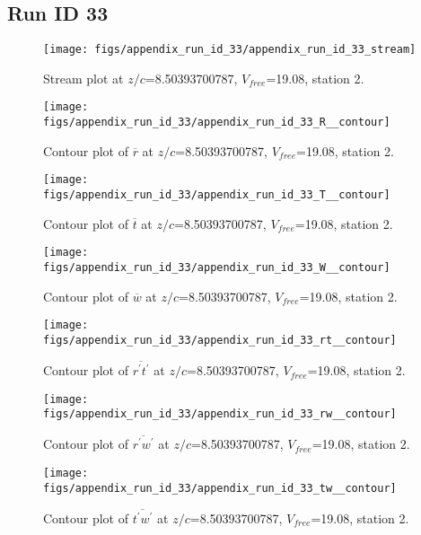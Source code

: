\subsection{Run ID 33}
\begin{figure}[H]
\centering
\texttt{[image: figs/appendix\_run\_id\_33/appendix\_run\_id\_33\_stream]}
\caption{Stream plot at $z/c$=8.50393700787, $V_{free}$=19.08, station 2.}
\label{fig:appendix_run_id_33_stream}
\end{figure}


\begin{figure}[H]
\centering
\texttt{[image: figs/appendix\_run\_id\_33/appendix\_run\_id\_33\_R\_\_contour]}
\caption{Contour plot of $\overline{r}$ at $z/c$=8.50393700787, $V_{free}$=19.08, station 2.}
\label{fig:appendix_run_id_33_R__contour}
\end{figure}


\begin{figure}[H]
\centering
\texttt{[image: figs/appendix\_run\_id\_33/appendix\_run\_id\_33\_T\_\_contour]}
\caption{Contour plot of $\overline{t}$ at $z/c$=8.50393700787, $V_{free}$=19.08, station 2.}
\label{fig:appendix_run_id_33_T__contour}
\end{figure}


\begin{figure}[H]
\centering
\texttt{[image: figs/appendix\_run\_id\_33/appendix\_run\_id\_33\_W\_\_contour]}
\caption{Contour plot of $\overline{w}$ at $z/c$=8.50393700787, $V_{free}$=19.08, station 2.}
\label{fig:appendix_run_id_33_W__contour}
\end{figure}


\begin{figure}[H]
\centering
\texttt{[image: figs/appendix\_run\_id\_33/appendix\_run\_id\_33\_rt\_\_contour]}
\caption{Contour plot of $\overline{r^\prime t^\prime}$ at $z/c$=8.50393700787, $V_{free}$=19.08, station 2.}
\label{fig:appendix_run_id_33_rt__contour}
\end{figure}


\begin{figure}[H]
\centering
\texttt{[image: figs/appendix\_run\_id\_33/appendix\_run\_id\_33\_rw\_\_contour]}
\caption{Contour plot of $\overline{r^\prime w^\prime}$ at $z/c$=8.50393700787, $V_{free}$=19.08, station 2.}
\label{fig:appendix_run_id_33_rw__contour}
\end{figure}


\begin{figure}[H]
\centering
\texttt{[image: figs/appendix\_run\_id\_33/appendix\_run\_id\_33\_tw\_\_contour]}
\caption{Contour plot of $\overline{t^\prime w^\prime}$ at $z/c$=8.50393700787, $V_{free}$=19.08, station 2.}
\label{fig:appendix_run_id_33_tw__contour}
\end{figure}


